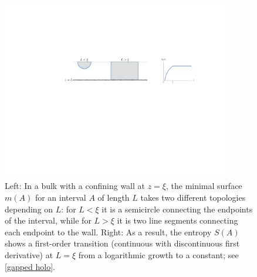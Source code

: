\documentclass[11pt]{article}
\begin{document}
\begin{figure}[tbp]
\centering
\includegraphics[width=0.9\textwidth]{figs/deconfinement}
\caption{\label{fig:deconfinement}
Left: In a bulk with a confining wall at $z=\xi$, the minimal surface $m(A)$ for an interval $A$ of length $L$ takes two different topologies depending on $L$: for $L<\xi$ it is a semicircle connecting the endpoints of the interval, while for $L>\xi$ it is two line segments connecting each endpoint to the wall. Right: As a result, the entropy $S(A)$ shows a first-order transition (continuous with discontinuous first derivative) at $L=\xi$ from a logarithmic growth to a constant; see \eqref{gapped holo}.
}
\end{figure}
\end{document}
